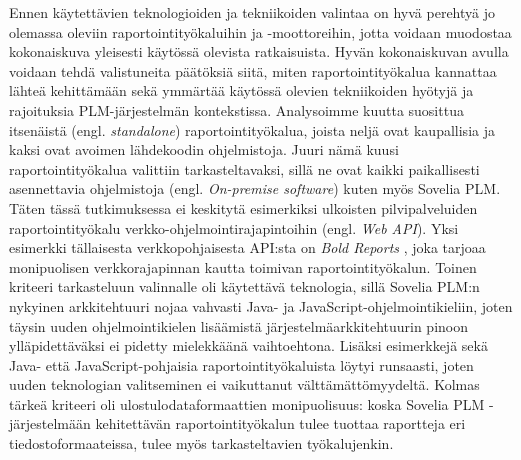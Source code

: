 Ennen käytettävien teknologioiden ja tekniikoiden valintaa on hyvä perehtyä jo olemassa oleviin raportointityökaluihin ja -moottoreihin, jotta voidaan muodostaa kokonaiskuva yleisesti käytössä olevista ratkaisuista. Hyvän kokonaiskuvan avulla voidaan tehdä valistuneita päätöksiä siitä, miten raportointityökalua kannattaa lähteä kehittämään sekä ymmärtää käytössä olevien tekniikoiden hyötyjä ja rajoituksia PLM-järjestelmän kontekstissa. Analysoimme kuutta suosittua itsenäistä (engl. \textit{standalone}) raportointityökalua, joista neljä ovat kaupallisia ja kaksi ovat avoimen lähdekoodin ohjelmistoja. Juuri nämä kuusi raportointityökalua valittiin tarkasteltavaksi, sillä ne ovat kaikki paikallisesti asennettavia ohjelmistoja (engl. \textit{On-premise software}) kuten myös Sovelia PLM. Täten tässä tutkimuksessa ei keskitytä esimerkiksi ulkoisten pilvipalveluiden raportointityökalu verkko-ohjelmointirajapintoihin (engl. \textit{Web API}). Yksi esimerkki tällaisesta verkkopohjaisesta API:sta on \textit{Bold Reports} \cite{noauthor_bi_2022}, joka tarjoaa monipuolisen verkkorajapinnan kautta toimivan raportointityökalun. Toinen kriteeri tarkasteluun valinnalle oli käytettävä teknologia, sillä Sovelia PLM:n nykyinen arkkitehtuuri nojaa vahvasti Java- ja JavaScript-ohjelmointikieliin, joten täysin uuden ohjelmointikielen lisäämistä järjestelmäarkkitehtuurin pinoon ylläpidettäväksi ei pidetty mielekkäänä vaihtoehtona. Lisäksi esimerkkejä sekä Java- että JavaScript-pohjaisia raportointityökaluista löytyi runsaasti, joten uuden teknologian valitseminen ei vaikuttanut välttämättömyydeltä. Kolmas tärkeä kriteeri oli ulostulodataformaattien monipuolisuus: koska Sovelia PLM -järjestelmään kehitettävän raportointityökalun tulee tuottaa raportteja eri tiedostoformaateissa, tulee myös tarkasteltavien työkalujenkin.

